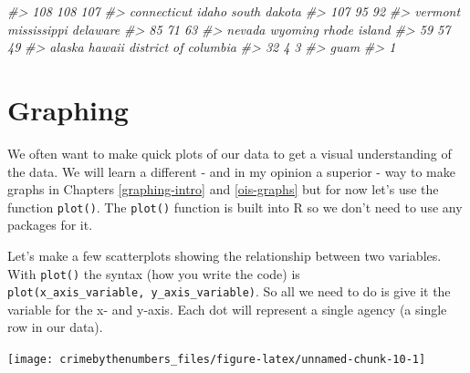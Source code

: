 \documentclass[
]{krantz}
\makeatletter
\newenvironment{Shaded}{\begin{snugshade}}{\end{snugshade}}
\newcommand{\CommentTok}[1]{\textcolor[rgb]{0.37,0.37,0.37}{\textit{#1}}}
\newcommand{\FunctionTok}[1]{\textcolor[rgb]{0,0,0}{#1}}
\newcommand{\NormalTok}[1]{#1}
\newcommand{\SpecialCharTok}[1]{\textcolor[rgb]{0,0,0}{#1}}
\newenvironment{kframe}{%
\medskip{}
\setlength{\fboxsep}{.8em}
 \def\at@end@of@kframe{}%
 \ifinner\ifhmode%
  \def\at@end@of@kframe{\end{minipage}}%
  \begin{minipage}{\columnwidth}%
 \fi\fi%
 \def\FrameCommand##1{\hskip\@totalleftmargin \hskip-\fboxsep
 \colorbox{shadecolor}{##1}\hskip-\fboxsep
     \hskip-\linewidth \hskip-\@totalleftmargin \hskip\columnwidth}%
 \MakeFramed {\advance\hsize-\width
   \@totalleftmargin\z@ \linewidth\hsize
   \@setminipage}}%
 {\par\unskip\endMakeFramed%
 \at@end@of@kframe}
\renewenvironment{Shaded}{\begin{kframe}}{\end{kframe}}
\makeatother
\begin{document}
\begin{Shaded}
\begin{Highlighting}[]
\CommentTok{\#\textgreater{}                  108                  108                  107 }
\CommentTok{\#\textgreater{}          connecticut                idaho         south dakota }
\CommentTok{\#\textgreater{}                  107                   95                   92 }
\CommentTok{\#\textgreater{}              vermont          mississippi             delaware }
\CommentTok{\#\textgreater{}                   85                   71                   63 }
\CommentTok{\#\textgreater{}               nevada              wyoming         rhode island }
\CommentTok{\#\textgreater{}                   59                   57                   49 }
\CommentTok{\#\textgreater{}               alaska               hawaii district of columbia }
\CommentTok{\#\textgreater{}                   32                    4                    3 }
\CommentTok{\#\textgreater{}                 guam }
\CommentTok{\#\textgreater{}                    1}
\end{Highlighting}
\end{Shaded}

\hypertarget{graphing-1}{%
\section{Graphing}\label{graphing-1}}

We often want to make quick plots of our data to get a visual understanding of the data. We will learn a different - and in my opinion a superior - way to make graphs in Chapters \ref{graphing-intro} and \ref{ois-graphs} but for now let's use the function \texttt{plot()}. The \texttt{plot()} function is built into R so we don't need to use any packages for it.

Let's make a few scatterplots showing the relationship between two variables. With \texttt{plot()} the syntax (how you write the code) is \texttt{plot(x\_axis\_variable,\ y\_axis\_variable)}. So all we need to do is give it the variable for the x- and y-axis. Each dot will represent a single agency (a single row in our data).

\begin{Shaded}
\end{Shaded}

\begin{center}\texttt{[image: crimebythenumbers\_files/figure-latex/unnamed-chunk-10-1]} \end{center}
\end{document}
